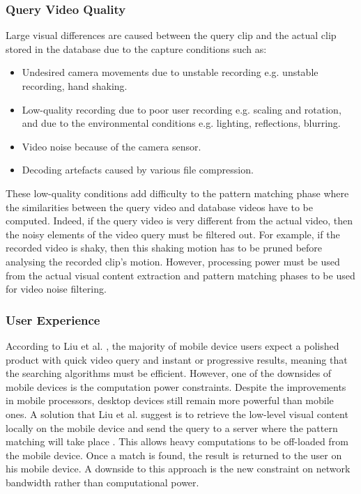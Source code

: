 \subsubsection{Query Video Quality}

Large visual differences are caused between the query clip and the actual clip stored in the database due to the capture conditions \cite{liu2014mobilevideosearch} \cite{wang2016actionregonition} such as:
\begin{itemize}
    \item Undesired camera movements due to unstable recording e.g. unstable recording, hand shaking.
    \item Low-quality recording due to poor user recording e.g. scaling and rotation, and due to the environmental conditions e.g. lighting, reflections, blurring.
    \item Video noise because of the camera sensor.
    \item Decoding artefacts caused by various file compression.
\end{itemize}

These low-quality conditions add difficulty to the pattern matching phase where the similarities between the query video and database videos have to be computed. Indeed, if the query video is very different from the actual video, then the noisy elements of the video query must be filtered out. For example, if the recorded video is shaky, then this shaking motion has to be pruned before analysing the recorded clip's motion. However, processing power must be used from the actual visual content extraction and pattern matching phases to be used for video noise filtering.

\subsubsection{User Experience}

According to Liu et al. \cite{liu2014mobilevideosearch}, the majority of mobile device users expect a polished product with quick video query and instant or progressive results, meaning that the searching algorithms must be efficient. However, one of the downsides of mobile devices is the computation power constraints. Despite the improvements in mobile processors, desktop devices still remain more powerful than mobile ones. A solution that Liu et al. suggest is to retrieve the low-level visual content locally on the mobile device and send the query to a server where the pattern matching will take place \cite{liu2014mobilevideosearch}. This allows heavy computations to be off-loaded from the mobile device. Once a match is found, the result is returned to the user on his mobile device. A downside to this approach is the new constraint on network bandwidth rather than computational power.

